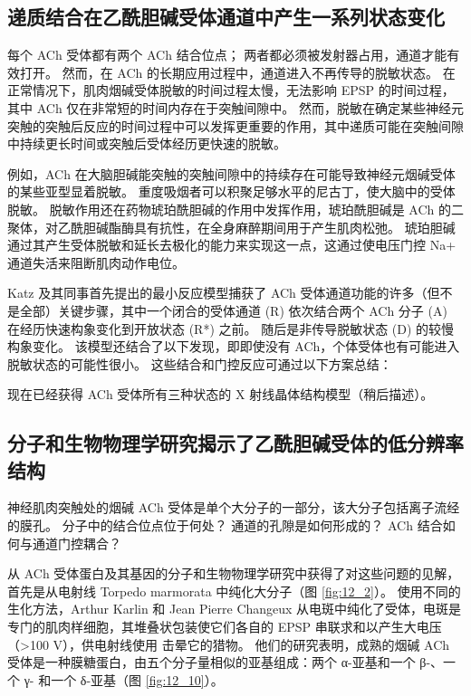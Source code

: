 \subsection{递质结合在乙酰胆碱受体通道中产生一系列状态变化}
每个 ACh 受体都有两个 ACh 结合位点； 两者都必须被发射器占用，通道才能有效打开。 
然而，在 ACh 的长期应用过程中，通道进入不再传导的脱敏状态。 
在正常情况下，肌肉烟碱受体脱敏的时间过程太慢，无法影响 EPSP 的时间过程，其中 ACh 仅在非常短的时间内存在于突触间隙中。 
然而，脱敏在确定某些神经元突触的突触后反应的时间过程中可以发挥更重要的作用，其中递质可能在突触间隙中持续更长时间或突触后受体经历更快速的脱敏。


例如，ACh 在大脑胆碱能突触的突触间隙中的持续存在可能导致神经元烟碱受体的某些亚型显着脱敏。 
重度吸烟者可以积聚足够水平的尼古丁，使大脑中的受体脱敏。 
脱敏作用还在药物琥珀酰胆碱的作用中发挥作用，琥珀酰胆碱是 ACh 的二聚体，对乙酰胆碱酯酶具有抗性，在全身麻醉期间用于产生肌肉松弛。 
琥珀胆碱通过其产生受体脱敏和延长去极化的能力来实现这一点，这通过使电压门控 Na+ 通道失活来阻断肌肉动作电位。


Katz 及其同事首先提出的最小反应模型捕获了 ACh 受体通道功能的许多（但不是全部）关键步骤，其中一个闭合的受体通道 (R) 依次结合两个 ACh 分子 (A) 在经历快速构象变化到开放状态 (R*) 之前。 
随后是非传导脱敏状态 (D) 的较慢构象变化。 
该模型还结合了以下发现，即即使没有 ACh，个体受体也有可能进入脱敏状态的可能性很小。 
这些结合和门控反应可通过以下方案总结：


现在已经获得 ACh 受体所有三种状态的 X 射线晶体结构模型（稍后描述）。


\subsection{分子和生物物理学研究揭示了乙酰胆碱受体的低分辨率结构}

神经肌肉突触处的烟碱 ACh 受体是单个大分子的一部分，该大分子包括离子流经的膜孔。 
分子中的结合位点位于何处？ 通道的孔隙是如何形成的？ ACh 结合如何与通道门控耦合？


从 ACh 受体蛋白及其基因的分子和生物物理学研究中获得了对这些问题的见解，首先是从电射线 Torpedo marmorata 中纯化大分子（图 \ref{fig:12_2}）。 
使用不同的生化方法，Arthur Karlin 和 Jean Pierre Changeux 从电斑中纯化了受体，电斑是专门的肌肉样细胞，其堆叠状包装使它们各自的 EPSP 串联求和以产生大电压（>100 V），供电射线使用 击晕它的猎物。 
他们的研究表明，成熟的烟碱 ACh 受体是一种膜糖蛋白，由五个分子量相似的亚基组成：两个 α-亚基和一个 β-、一个 γ- 和一个 δ-亚基（图 \ref{fig:12_10}）。

